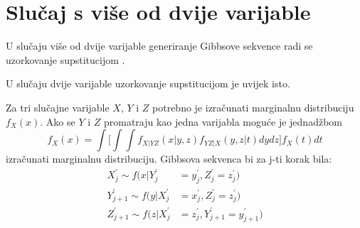 \section{Slučaj s više od dvije varijable}
U slučaju više od dvije varijable generiranje Gibbsove sekvence radi se uzorkovanje supstitucijom . 

U slučaju dvije varijable uzorkovanje supstitucijom je uvijek isto. 

Za tri slučajne varijable $X$, $Y$ i $Z$ potrebno je izračunati marginalnu distribuciju $f_X(x)$. Ako se $Y$ i $Z$ promatraju kao jedna varijabla moguće je jednadžbom 
\begin{equation}
f_X(x) = \int \bigg[ \int \int f_{X|YZ}(x|y,z)f_{YZ|X}(y,z|t)dydz \bigg] f_X(t)dt
\end{equation}
izračunati marginalnu distribuciju. Gibbsova sekvenca bi za j-ti korak bila:
\begin{align*}
X_{j}^{'} \sim f(x|Y_{j}^{'} &=y_{j}^{'}, Z_{j}^{'}=z_{j}^{'}) \nonumber \\
Y_{j+1}^{'} \sim f(y|X_{j}^{'} &=x_{j}^{'}, Z_{j}^{'}=z_{j}^{'}) \nonumber \\
Z_{j+1}^{'} \sim f(z|X_{j}^{'} &=z_{j}^{'}, Y_{j+1}^{'}=y_{j+1}^{'})
\end{align*}
